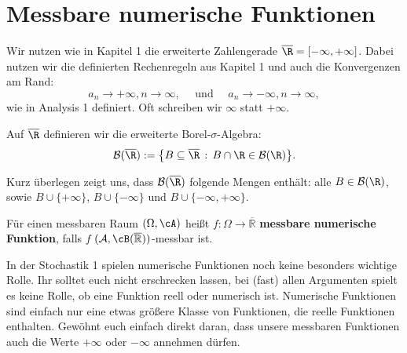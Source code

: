 \section{Messbare numerische Funktionen}

Wir nutzen wie in Kapitel 1 die erweiterte Zahlengerade $\overline \R=[-\infty,+\infty]$. Dabei nutzen wir die definierten \glqq Rechenregeln\grqq{} aus Kapitel 1 und auch die Konvergenzen am Rand: $$a_n \rightarrow +\infty, n \to \infty, \quad \text{ und }\quad a_n \rightarrow -\infty, n \to \infty,$$ wie in Analysis 1 definiert. Oft schreiben wir $\infty$ statt $+\infty$.
\begin{deff}
 Auf $\overline \R$ definieren wir die erweiterte Borel-$\sigma$-Algebra:
\begin{align*}
	\mathcal B(\overline \R):=\big \{ B\subseteq \overline \R\,: \, B\cap \R\in \mathcal B(\R)\big \}.
\end{align*}

\end{deff}
Kurz \"uberlegen zeigt uns, dass $\mathcal B(\overline \R)$ folgende Mengen enth\"alt: alle $B\in \mathcal B(\R)$, sowie $B \cup \{+\infty\}$, $B\cup \{-\infty\}$ und $B\cup \{-\infty,+\infty\}$.
\begin{deff}
	F\"ur einen messbaren Raum $(\Omega, \cA)$ hei\ss t $f \! : \Omega \rightarrow \overline{\mathbb{R}}$ \textbf{messbare numerische Funktion}, falls $f$ $(\mathcal A, \cB(\overline{\mathbb{R}}))$-messbar ist.
\end{deff}
In der Stochastik 1 spielen numerische Funktionen noch keine besonders wichtige Rolle. Ihr solltet euch nicht erschrecken lassen, bei (fast) allen Argumenten spielt es keine Rolle, ob eine Funktion reell oder numerisch ist. Numerische Funktionen sind einfach nur eine etwas gr\"o\ss ere Klasse von Funktionen, die reelle Funktionen enthalten. Gew\"ohnt euch einfach direkt daran, dass unsere messbaren Funktionen auch die Werte $+\infty$ oder $-\infty$ annehmen d\"urfen. 
